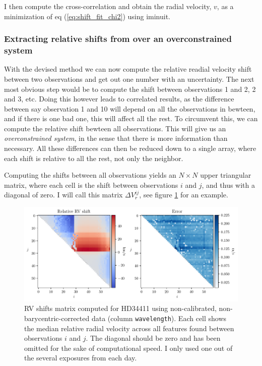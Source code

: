     I then compute the cross-correlation and obtain the radial velocity, $v$, as a minimization of eq (\ref{eq:shift_fit_chi2}) using iminuit.
    

    \subsubsection{Extracting relative shifts from over an overconstrained system}
    
    With the devised method we can now compute the relative readial velocity shift between two observations and get out one number with an uncertainty. The next most obvious step would be to compute the shift between observations 1 and 2, 2 and 3, etc. Doing this however leads to correlated results, as the difference between say observation 1 and 10 will depend on all the observations in bewteen, and if there is one bad one, this will affect all the rest. To circumvent this, we can compute the relative shift bewteen all observations. This will give us an \emph{overconstrained system}, in the sense that there is more information than necessary. All these differences can then be reduced down to a single array, where each shift is relative to all the rest, not only the neighbor. 
    
    Computing the shifts between all observations yields an $N\times N$ upper triangular matrix, where each cell is the shift between observations $i$ and $j$, and thus with a diagonal of zero. I will call this matrix $\Delta V_r^{ij}$, see figure \ref{fig:shift_matrix} for an example.
    
    \begin{figure}%
        \begin{wide}  
            \includegraphics[width=\textwidth]{figures/shfits_matrix_non_bary.pdf}
            \caption{RV shifts matrix computed for HD34411 using non-calibrated, non-barycentric-corrected data (column \texttt{wavelength}). Each cell shows the median relative radial velocity across all features found between observations $i$ and $j$. The diagonal should be zero and has been omitted for the sake of computational speed. I only used one out of the several exposures from each day.}
        \label{fig:shift_matrix}
        \end{wide}
    \end{figure}
            
